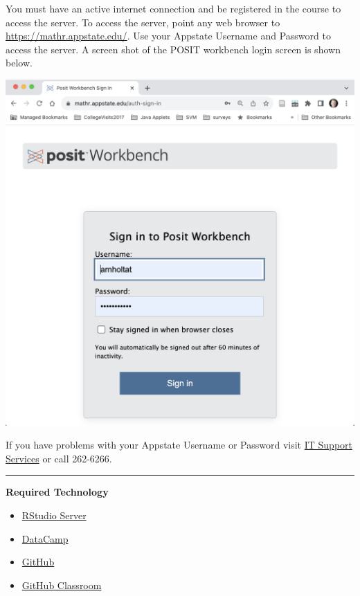 \documentclass[
]{article}
\providecommand{\tightlist}{%
  \setlength{\itemsep}{0pt}\setlength{\parskip}{0pt}}
\begin{document}
You must have an active internet connection and be registered in the
course to access the server. To access the server, point any web browser
to \url{https://mathr.appstate.edu/}. Use your Appstate Username and
Password to access the server. A screen shot of the POSIT workbench
login screen is shown below.

\begin{center}\includegraphics[width=13.56in]{POSITlogin} \end{center}

If you have problems with your Appstate Username or Password visit
\href{http://support.appstate.edu/}{IT Support Services} or call
262-6266.

\begin{center}\rule{0.5\linewidth}{0.5pt}\end{center}

\textbf{Required Technology}

\begin{itemize}
\tightlist
\item
  \href{https://mathr.math.appstate.edu/}{RStudio Server}
\item
  \href{https://www.datacamp.com/}{DataCamp}
\item
  \href{https://github.com/}{GitHub}
\item
  \href{https://classroom.github.com/}{GitHub Classroom}
\end{itemize}
\end{document}
